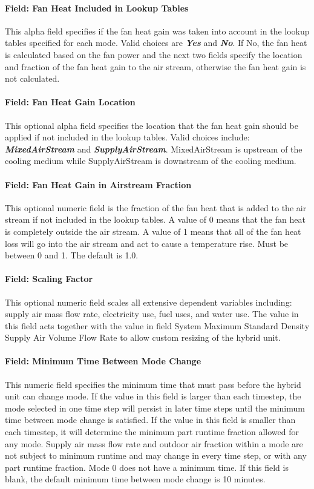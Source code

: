 \paragraph{Field: Fan Heat Included in Lookup Tables}
This alpha field specifies if the fan heat gain was taken into account in the lookup tables specified for each mode. Valid choices are \textbf{\emph{Yes}} and \textbf{\emph{No}}. If No, the fan heat is calculated based on the fan power and the next two fields specify the location and fraction of the fan heat gain to the air stream, otherwise the fan heat gain is not calculated.

\paragraph{Field: Fan Heat Gain Location}
This optional alpha field specifies the location that the fan heat gain should be applied if not included in the lookup tables. Valid choices include: \textbf{\emph{MixedAirStream}} and \textbf{\emph{SupplyAirStream}}. MixedAirStream is upstream of the cooling medium while SupplyAirStream is downstream of the cooling medium.

\paragraph{Field: Fan Heat Gain in Airstream Fraction}
This optional numeric field is the fraction of the fan heat that is added to the air stream if not included in the lookup tables. A value of 0 means that the fan heat is completely outside the air stream. A value of 1 means that all of the fan heat loss will go into the air stream and act to cause a temperature rise. Must be between 0 and 1. The default is 1.0.

\paragraph{Field: Scaling Factor}
This optional numeric field scales all extensive dependent variables including: supply air mass flow rate, electricity use, fuel uses, and water use. The value in this field acts together with the value in field System Maximum Standard Density Supply Air Volume Flow Rate to allow custom resizing of the hybrid unit.

\paragraph{Field: Minimum Time Between Mode Change}
This numeric field specifies the minimum time that must pass before the hybrid unit can change mode. If the value in this field is larger than each timestep, the mode selected in one time step will persist in later time steps until the minimum time between mode change is satisfied. If the value in this field is smaller than each timestep, it will determine the minimum part runtime fraction allowed for any mode. Supply air mass flow rate and outdoor air fraction within a mode are not subject to minimum runtime and may change in every time step, or with any part runtime fraction. Mode 0 does not have a minimum time. If this field is blank, the default minimum time between mode change is 10 minutes.


